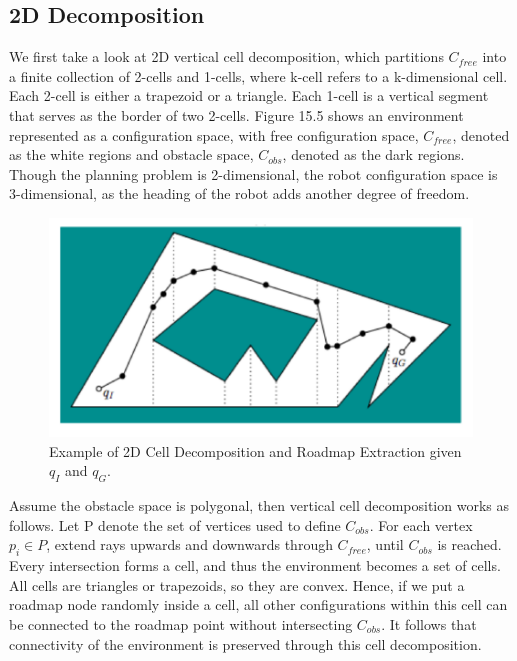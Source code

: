 \documentclass[twoside]{article}
\begin{document}
\subsection{2D Decomposition}
We first take a look at 2D vertical cell decomposition, which partitions $C_{free}$ into a finite collection of 2-cells and 1-cells, where k-cell refers to a k-dimensional cell. Each 2-cell is either a trapezoid or a triangle.
Each 1-cell is a vertical segment that serves as the border of two 2-cells. Figure 15.5 shows an environment represented as a configuration space, with free configuration space, $C_{free}$, denoted as the white regions and obstacle space, $C_{obs}$, denoted as the dark regions. Though the planning problem is 2-dimensional, the robot configuration space is 3-dimensional, as the heading of the robot adds another degree of freedom.

\begin{figure}[h]
\begin{center}
\includegraphics{fig15_5.PNG}
\caption{Example of 2D Cell Decomposition and Roadmap Extraction given $q_{I}$ and $q_{G}$.}
\end{center}
\end{figure}

Assume the obstacle space is polygonal, then vertical cell decomposition works as follows. Let P denote the set of vertices used to define $C_{obs}$. For each vertex $p_{i} \in P$, extend rays upwards and downwards through $C_{free}$, until $C_{obs}$ is reached. Every intersection forms a cell, and thus the environment becomes a set of cells. All cells are triangles or trapezoids, so they are convex. Hence, if we put a roadmap node randomly inside a cell, all other configurations within this cell can be connected to the roadmap point without intersecting $C_{obs}$. It follows that connectivity of the environment is preserved through this cell decomposition.
\end{document}
